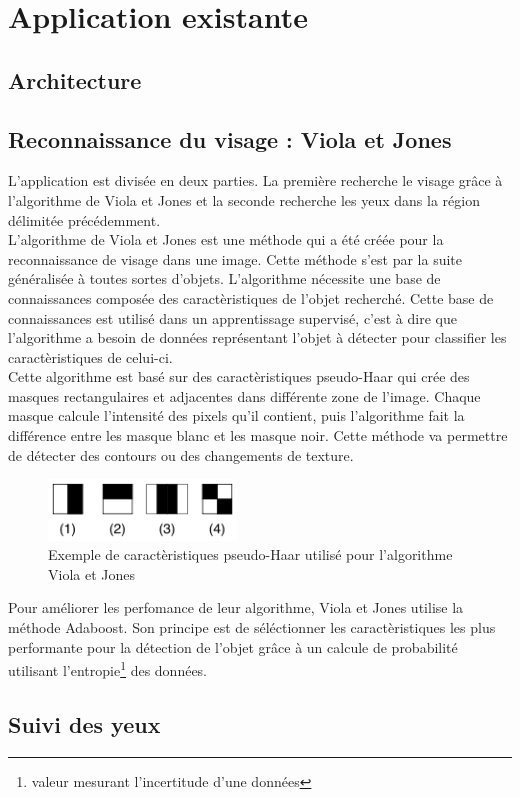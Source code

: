 \section{Application existante}

\subsection{Architecture}

\subsection{Reconnaissance du visage : Viola et Jones}
L'application est divisée en deux parties. La première recherche le visage grâce à
l'algorithme de Viola et Jones et la seconde recherche les yeux dans la région délimitée
précédemment.\\

L'algorithme de Viola et Jones\cite{Viola04robustreal-time} est une méthode qui a été créée pour la reconnaissance de visage dans une 
image. Cette méthode s'est par la suite généralisée à toutes sortes d'objets. L'algorithme nécessite une 
base de connaissances composée des caractèristiques de l'objet recherché. Cette base de connaissances est utilisé dans un 
apprentissage supervisé, c'est à dire que l'algorithme a besoin de données représentant
l'objet à détecter pour classifier les caractèristiques de celui-ci.\\

Cette algorithme est basé sur des caractèristiques pseudo-Haar qui crée des masques rectangulaires et adjacentes
dans différente zone de l'image. Chaque masque calcule l'intensité des pixels qu'il contient, puis l'algorithme fait
la différence entre les masque blanc et les masque noir. Cette méthode va permettre de détecter des contours ou des changements de 
texture.\\

\begin{figure}[H]
\center
\includegraphics[width=5cm]{image/pseudo_haar.png}
\caption{Exemple de caractèristiques pseudo-Haar utilisé pour l'algorithme Viola et Jones}
\end{figure}

Pour améliorer les perfomance de leur algorithme, Viola et Jones utilise la méthode Adaboost. Son
principe est de séléctionner les caractèristiques les plus performante pour la détection de l'objet grâce à
un calcule de probabilité utilisant l'entropie\footnote{valeur mesurant l'incertitude d'une données} des données.

\subsection{Suivi des yeux}

